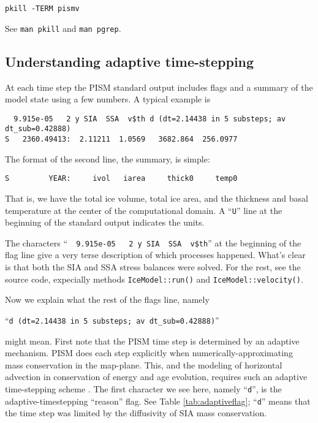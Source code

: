   \verb|pkill -TERM pismv|

\noindent See \verb|man pkill| and \verb|man pgrep|.



\subsection{Understanding adaptive time-stepping} \label{subsect:adapt} At each time step the PISM standard output includes flags and a summary of the model state using a few numbers.  A typical example is
\small
\begin{verbatim}
  9.915e-05   2 y SIA  SSA  v$th d (dt=2.14438 in 5 substeps; av dt_sub=0.42888)
S   2360.49413:  2.11211  1.0569   3682.864  256.0977
\end{verbatim}
\normalsize
\noindent The format of the second line, the summary, is simple:
\small
\begin{verbatim}
S         YEAR:     ivol   iarea     thick0     temp0
\end{verbatim}
\normalsize
That is, we have the total ice volume, total ice area, and the thickness and basal temperature at the center of the computational domain.  A ``\verb|U|'' line at the beginning of the standard output indicates the units.

The characters ``\verb|  9.915e-05   2 y SIA  SSA  v$th|'' at the beginning of the flag line give a very terse description of which processes happened.  What's clear is that both the SIA and SSA stress balances were solved.  For the rest, see the source code, expecially methods \verb|IceModel::run()| and \verb|IceModel::velocity()|.

Now we explain what the rest of the flags line, namely

``\verb|d (dt=2.14438 in 5 substeps; av dt_sub=0.42888)|''

\noindent might mean.  First note that the PISM time step is determined by an adaptive mechanism.  PISM does each step explicitly when numerically-approximating mass conservation in the map-plane.  This, and the modeling of horizontal advection in conservation of energy and age evolution, requires such an adaptive time-stepping scheme \cite{BBL}.  The first character we see here, namely ``\verb|d|'', is the adaptive-timestepping ``reason'' flag.  See Table \ref{tab:adaptiveflag}; ``\verb|d|'' means that the time step was limited by the diffusivity of SIA mass conservation.


